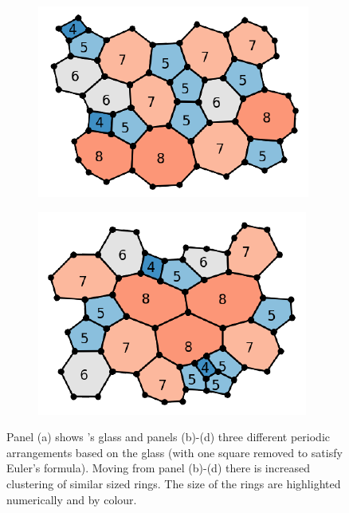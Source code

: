 \begin{figure}[h]
     \begin{subfigure}[b]{0.25\textwidth}
         \centering
         \includegraphics[width=\textwidth]{./figures/introduction/zach_mid.pdf}
         \caption{}
     \end{subfigure}
     \hspace{1cm}
     \begin{subfigure}[b]{0.25\textwidth}
         \centering
         \includegraphics[width=\textwidth]{./figures/introduction/zach_low.pdf}
         \caption{}
         \label{fig:zach_low}
     \end{subfigure}
     
     \caption{Panel (a) shows \zach's glass and panels (b)\--(d) three different periodic arrangements based on the glass (with one square removed to satisfy Euler's formula). Moving from panel (b)\--(d) there is increased clustering of similar sized rings. The size of the rings are highlighted numerically and by colour.}
     \label{fig:zach}
\end{figure}


